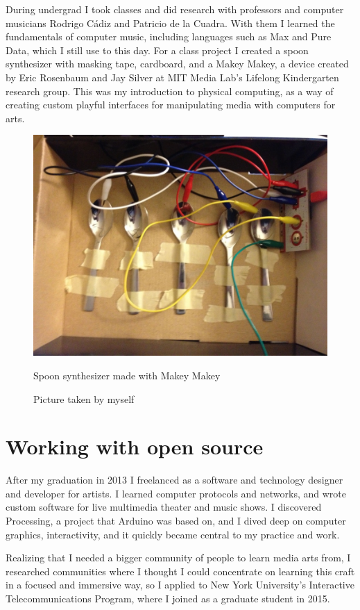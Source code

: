 During undergrad I took classes and did research with professors and computer musicians Rodrigo Cádiz and Patricio de la Cuadra. With them I learned the fundamentals of computer music, including languages such as Max and Pure Data, which I still use to this day. For a class project I created a spoon synthesizer with masking tape, cardboard, and a Makey Makey, a device created by Eric Rosenbaum and Jay Silver at MIT Media Lab's Lifelong Kindergarten research group. This was my introduction to physical computing, as a way of creating custom playful interfaces for manipulating media with computers for arts.
 
\begin{figure}[ht]
  \centering
  \includegraphics[width=0.75\linewidth,height=0.25\textheight,keepaspectratio]{images/makey-makey-spoons.jpg}
  \caption{Spoon synthesizer made with Makey Makey}
  \caption*{Picture taken by myself}
  \label{fig:makey-makey-spoons}
\end{figure}

\section{Working with open source}

After my graduation in 2013 I freelanced as a software and technology designer and developer for artists. I learned computer protocols and networks, and wrote custom software for live multimedia theater and music shows. I discovered Processing, a project that Arduino was based on, and I dived deep on computer graphics, interactivity, and it quickly became central to my practice and work.

Realizing that I needed a bigger community of people to learn media arts from, I researched communities where I thought I could concentrate on learning this craft in a focused and immersive way, so I applied to New York University's Interactive Telecommunications Program, where I joined as a graduate student in 2015. 


